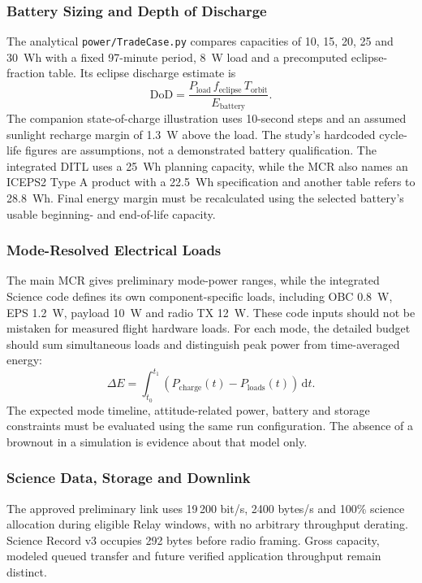 \subsubsection{Battery Sizing and Depth of Discharge}\label{app:battery-trades}
The analytical \texttt{power/TradeCase.py} compares capacities of 10, 15, 20, 25 and 30~Wh with a fixed 97-minute period, 8~W load and a precomputed eclipse-fraction table. Its eclipse discharge estimate is
\begin{equation}\label{eq:tradecase-dod}\mathrm{DoD}=\frac{P_{\mathrm{load}}\,f_{\mathrm{eclipse}}\,T_{\mathrm{orbit}}}{E_{\mathrm{battery}}}.\end{equation}
The companion state-of-charge illustration uses 10-second steps and an assumed sunlight recharge margin of 1.3~W above the load. The study's hardcoded cycle-life figures are assumptions, not a demonstrated battery qualification. The integrated DITL uses a 25~Wh planning capacity, while the MCR also names an ICEPS2 Type A product with a 22.5~Wh specification and another table refers to 28.8~Wh. Final energy margin must be recalculated using the selected battery's usable beginning- and end-of-life capacity.
\subsubsection{Mode-Resolved Electrical Loads}\label{app:mode-power}
The main MCR gives preliminary mode-power ranges, while the integrated Science code defines its own component-specific loads, including OBC 0.8~W, EPS 1.2~W, payload 10~W and radio TX 12~W. These code inputs should not be mistaken for measured flight hardware loads. For each mode, the detailed budget should sum simultaneous loads and distinguish peak power from time-averaged energy:
\begin{equation}\label{eq:energy-balance}\Delta E=\int_{t_0}^{t_1}\!\left(P_{\mathrm{charge}}(t)-P_{\mathrm{loads}}(t)\right)\,\mathrm dt.\end{equation}
The expected mode timeline, attitude-related power, battery and storage constraints must be evaluated using the same run configuration. The absence of a brownout in a simulation is evidence about that model only.
\subsubsection{Science Data, Storage and Downlink}\label{app:data-budget}
\label{app:science-data-budget}
The approved preliminary link uses 19\,200 bit/s, 2400 bytes/s and 100\% science allocation during eligible Relay windows, with no arbitrary throughput derating. Science Record v3 occupies 292 bytes before radio framing. Gross capacity, modeled queued transfer and future verified application throughput remain distinct.

